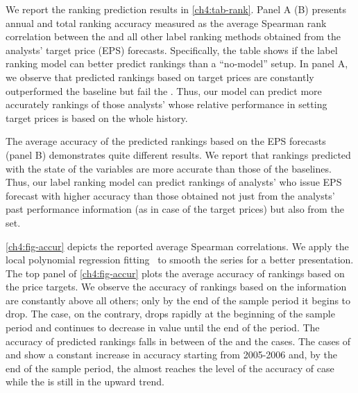 \documentclass[a4paper,twoside,12pt,openright,notitlepage]{report}\usepackage[]{graphicx}\usepackage[]{color}
\begin{document}
We report the ranking prediction results in \ref{ch4:tab-rank}. Panel A (B)  presents annual and total ranking accuracy measured as the average Spearman rank correlation between the \true{} and all other label ranking methods obtained from the analysts' target price (EPS) forecasts. Specifically, the table shows  if the label ranking model can better predict rankings than a ``no-model'' setup.  In panel A, we observe that  predicted rankings based on target prices are constantly outperformed the  baseline but fail  the  \naive{}. Thus, our model can predict more accurately rankings of those analysts' whose  relative performance in setting target prices is based on the whole history.

The average accuracy of the predicted rankings based on the EPS forecasts (panel B) demonstrates quite different results. We report that rankings predicted  with the \diff{} state of the variables are more accurate  than those of the baselines. Thus, our label ranking model can predict rankings of analysts' who issue EPS forecast with higher accuracy than those obtained not just from  the  analysts' past performance information (as in case of the target prices) but also from the \naive{} set.

\ref{ch4:fig-accur} depicts the reported average Spearman correlations. We apply the local polynomial regression fitting~\citep{cleveland1992} to smooth the series for a better presentation. The top panel of \ref{ch4:fig-accur} plots the average accuracy of rankings based on the price targets. We observe the accuracy of rankings based on the \naive{} information are constantly above all others; only by the end of the sample period it begins to drop. The  case, on the contrary, drops rapidly at the beginning of the sample period and continues to decrease in value until the end of the period. The accuracy of predicted rankings falls in between of the \naive{} and the  cases. The cases of \diff{} and \random{} show a constant increase in accuracy starting from 2005-2006  and, by the end of the sample period, the \random{} almost reaches the level of the accuracy of \naive{} case while the \diff{} is still in the upward trend.
\end{document}
